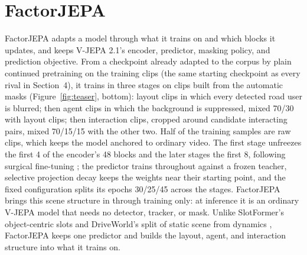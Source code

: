 \section{FactorJEPA}

FactorJEPA adapts a model through what it trains on and which blocks it updates, and keeps V-JEPA 2.1's encoder, predictor, masking policy, and prediction objective. From a checkpoint already adapted to the corpus by plain continued pretraining on the training clips (the same starting checkpoint as every rival in Section~4), it trains in three stages on clips built from the automatic masks (Figure~\ref{fig:teaser}, bottom): layout clips in which every detected road user is blurred; then agent clips in which the background is suppressed, mixed 70/30 with layout clips; then interaction clips, cropped around candidate interacting pairs, mixed 70/15/15 with the other two. Half of the training samples are raw clips, which keeps the model anchored to ordinary video. The first stage unfreezes the first 4 of the encoder's 48 blocks and the later stages the first 8, following surgical fine-tuning \cite{lee2023surgical}; the predictor trains throughout against a frozen teacher, selective projection decay \cite{tian2024spd} keeps the weights near their starting point, and the fixed configuration splits its epochs 30/25/45 across the stages. FactorJEPA brings this scene structure in through training only: at inference it is an ordinary V-JEPA model that needs no detector, tracker, or mask. Unlike SlotFormer's object-centric slots \cite{wu2023slotformer} and DriveWorld's split of static scene from dynamics \cite{min2024driveworld}, FactorJEPA keeps one predictor and builds the layout, agent, and interaction structure into what it trains on.
